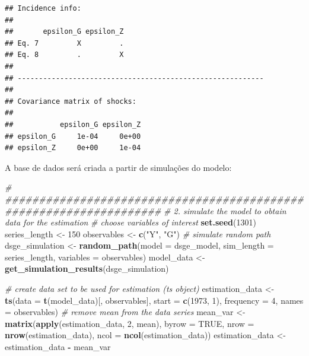 \documentclass[12pt,a4paper,]{article}
\newcommand{\0}{\mathbf{0}}
\newenvironment{Shaded}{\begin{snugshade}}{\end{snugshade}}
\newcommand{\CommentTok}[1]{\textcolor[rgb]{0.56,0.35,0.01}{\textit{#1}}}
\newcommand{\DataTypeTok}[1]{\textcolor[rgb]{0.13,0.29,0.53}{#1}}
\newcommand{\DecValTok}[1]{\textcolor[rgb]{0.00,0.00,0.81}{#1}}
\newcommand{\KeywordTok}[1]{\textcolor[rgb]{0.13,0.29,0.53}{\textbf{#1}}}
\newcommand{\NormalTok}[1]{#1}
\newcommand{\OperatorTok}[1]{\textcolor[rgb]{0.81,0.36,0.00}{\textbf{#1}}}
\newcommand{\OtherTok}[1]{\textcolor[rgb]{0.56,0.35,0.01}{#1}}
\newcommand{\StringTok}[1]{\textcolor[rgb]{0.31,0.60,0.02}{#1}}
\begin{document}
\begin{verbatim}
## Incidence info:
## 
##       epsilon_G epsilon_Z
## Eq. 7         X         .
## Eq. 8         .         X
## 
## ---------------------------------------------------------- 
## 
## Covariance matrix of shocks: 
## 
##           epsilon_G epsilon_Z
## epsilon_G     1e-04     0e+00
## epsilon_Z     0e+00     1e-04
\end{verbatim}

A base de dados será criada a partir de simulações do modelo:

\begin{Shaded}
\begin{Highlighting}[]
\CommentTok{# ###################################################################}
\CommentTok{# 2. simulate the model to obtain data for the estimation}
\CommentTok{# choose variables of interest}
\KeywordTok{set.seed}\NormalTok{(}\DecValTok{1301}\NormalTok{)}
\NormalTok{series_length <-}\StringTok{ }\DecValTok{150}
\NormalTok{observables <-}\StringTok{ }\KeywordTok{c}\NormalTok{(}\StringTok{"Y"}\NormalTok{, }\StringTok{"G"}\NormalTok{)}
\CommentTok{# simulate random path}
\NormalTok{dsge_simulation <-}\StringTok{ }\KeywordTok{random_path}\NormalTok{(}\DataTypeTok{model =}\NormalTok{ dsge_model,}
                               \DataTypeTok{sim_length =}\NormalTok{ series_length,}
                               \DataTypeTok{variables =}\NormalTok{ observables)}
\NormalTok{model_data <-}\StringTok{ }\KeywordTok{get_simulation_results}\NormalTok{(dsge_simulation)}

\CommentTok{# create data set to be used for estimation (ts object)}
\NormalTok{estimation_data <-}\StringTok{ }\KeywordTok{ts}\NormalTok{(}\DataTypeTok{data =} \KeywordTok{t}\NormalTok{(model_data)[, observables],}
                      \DataTypeTok{start =} \KeywordTok{c}\NormalTok{(}\DecValTok{1973}\NormalTok{, }\DecValTok{1}\NormalTok{),}
                      \DataTypeTok{frequency =} \DecValTok{4}\NormalTok{, }\DataTypeTok{names =}\NormalTok{ observables)}
\CommentTok{# remove mean from the data series}
\NormalTok{mean_var <-}\StringTok{ }\KeywordTok{matrix}\NormalTok{(}\KeywordTok{apply}\NormalTok{(estimation_data, }\DecValTok{2}\NormalTok{, mean),}
                   \DataTypeTok{byrow =} \OtherTok{TRUE}\NormalTok{,}
                   \DataTypeTok{nrow =} \KeywordTok{nrow}\NormalTok{(estimation_data),}
                   \DataTypeTok{ncol =} \KeywordTok{ncol}\NormalTok{(estimation_data))}
\NormalTok{estimation_data <-}\StringTok{ }\NormalTok{estimation_data }\OperatorTok{-}\StringTok{ }\NormalTok{mean_var}
\end{Highlighting}
\end{Shaded}
\end{document}
